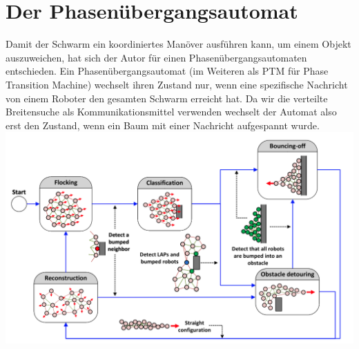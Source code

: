 \section{Der Phasenübergangsautomat}

Damit der Schwarm ein koordiniertes Manöver ausführen kann, um einem Objekt auszuweichen, hat sich der
Autor für einen Phasenübergangsautomaten entschieden. Ein Phasenübergangsautomat (im Weiteren als PTM 
für Phase Transition Machine) wechselt ihren Zustand nur, wenn eine spezifische Nachricht von einem
Roboter den gesamten Schwarm erreicht hat. Da wir die verteilte Breitensuche als Kommunikationsmittel
verwenden wechselt der Automat also erst den Zustand, wenn ein Baum mit einer Nachricht aufgespannt wurde.\\

\includegraphics[width=5.8in]{images/Screenshot 2023-02-20 at 1.02.59 PM.png}